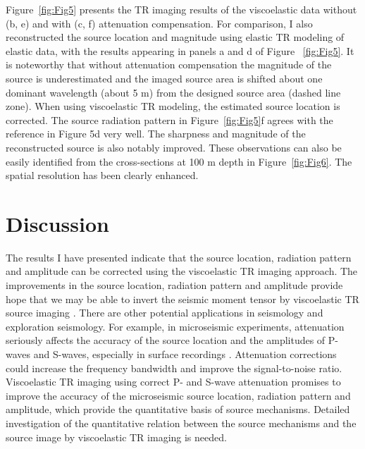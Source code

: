 

Figure~\ref{fig:Fig5} presents the TR imaging results of the viscoelastic data without (b, e) and with (c, f) attenuation compensation. For comparison, I also reconstructed the source location and magnitude using elastic TR modeling of elastic data, with the results appearing in panels a and d of Figure ~\ref{fig:Fig5}. It is noteworthy that without attenuation compensation the magnitude of the source is underestimated and the imaged source area is shifted about one dominant wavelength (about 5 m) from the designed source area (dashed line zone). When using viscoelastic TR modeling, the estimated source location is corrected. The source radiation pattern in Figure~\ref{fig:Fig5}f agrees with the reference in Figure 5d very well. The sharpness and magnitude of the reconstructed source is also notably improved. These observations can also be easily identified from the cross-sections at 100 m depth in Figure~\ref{fig:Fig6}. The spatial resolution has been clearly enhanced. 



\section{Discussion}
The results I have presented indicate that the source location, radiation pattern and amplitude can be corrected using the viscoelastic TR imaging approach. The improvements in the source location, radiation pattern and amplitude provide hope that we may be able to invert the seismic moment tensor by viscoelastic TR source imaging \cite[]{kaw08}. There are other potential applications in seismology and exploration seismology. For example, in microseismic experiments, attenuation seriously affects the accuracy of the source location and the amplitudes of P-waves and S-waves, especially in surface recordings \cite[]{eisner11}. Attenuation corrections could increase the frequency bandwidth and improve the signal-to-noise ratio. Viscoelastic TR imaging using correct P- and S-wave attenuation promises to improve the accuracy of the microseismic source location, radiation pattern and amplitude, which provide the quantitative basis of source mechanisms. Detailed investigation of the quantitative relation between the source mechanisms and the source image by viscoelastic TR imaging is needed.

